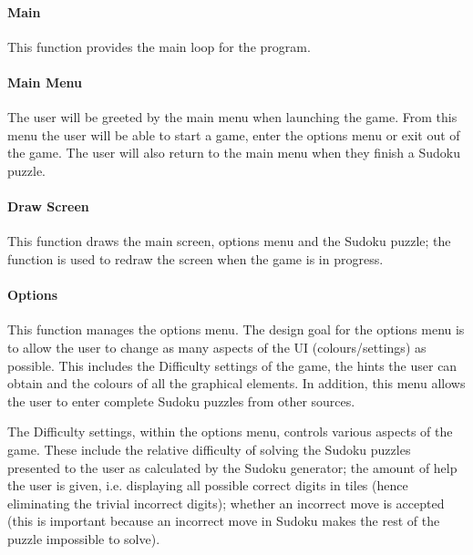 \documentclass[fleqn]{article}
\begin{document}
 


\paragraph{Main}
This function provides the main loop for the program. 

\paragraph{Main Menu}
The user will be greeted by the main menu when launching the game. From this menu the user will be able to start a game, enter the options menu or exit out of the game. The user will also return to the main menu when they finish a Sudoku puzzle.

\paragraph{Draw Screen}
This function draws the main screen, options menu and the Sudoku puzzle; the function is used to redraw the screen when the game is in progress.
 
\paragraph{Options}
This function manages the options menu. The design goal for the options menu is to allow the user to change as many aspects of the UI (colours/settings) as possible. This includes the Difficulty settings of the game, the hints the user can obtain and the colours of all the graphical elements. In addition, this menu allows the user to enter complete Sudoku puzzles from other sources.
 
The Difficulty settings, within the options menu, controls various aspects of the game. These include the relative difficulty of solving the Sudoku puzzles presented to the user as calculated by the Sudoku generator; the amount of help the user is given, i.e. displaying all possible correct digits in tiles (hence eliminating the trivial incorrect digits); whether an incorrect move is accepted (this is important because an incorrect move in Sudoku makes the rest of the puzzle impossible to solve).
\end{document}
